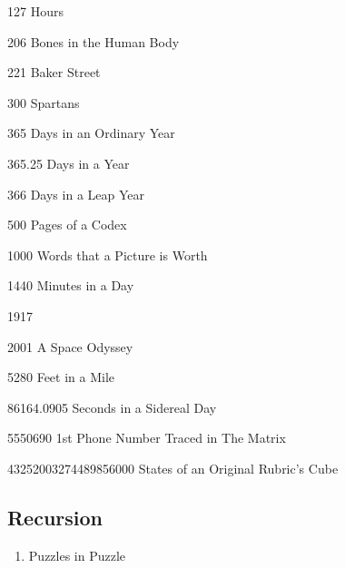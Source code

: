 \documentclass[10pt]{article}
\begin{document}
\begin{multicols}{4}
\begin{description}
	\item 127 \w H{ours}
    \item 206 \w B{ones} in the \w H{uman} \w B{ody}
    \item 221 \w B{aker} \w S{treet}
	\item 300 \w S{partans}
    \item 365 \w D{ays} in an \w O{rdinary} \w Y{ear}
    \item 365.25 \w D{ays}  in a \w Y{ear}
    \item 366 \w D{ays} in a \w L{eap} \w Y{ear}
    \item 500 \w P{ages} of a \w C{odex}
    \item 1000 \w W{ords} that a \w P{icture} is \w W{orth}
    \item 1440 \w M{inutes}  in a \w D{ay}
	\item 1917
	\item 2001 A \w S{pace} \w O{dyssey}
     \item 5280 \w F{eet}  in a \w M{ile}
    \item 86164.0905 \w S{econds} in a \w S{idereal} \w D{ay}
	\item 5550690 1st \w P{hone} \w N{umber} \w T{raced} in \w T{he} \w M{atrix}
     \item 43252003274489856000 \w S{tates} of an \w O{riginal} \w R{ubric's} \w C{ube}
\end{description}

\subsection*{Recursion}

\begin{enumerate}[label=\arabic*,resume]
\item \w P{uzzles} in  \w P{uzzle}
\end{enumerate}
\end{multicols}
\end{document}
